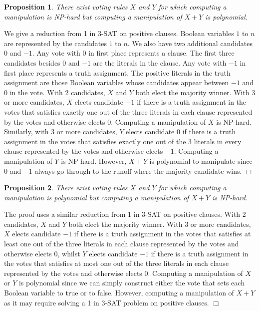 \documentclass{ecai2012}
\newcommand{\winner}[2]{\mbox{$#1 + #2$}}
\newtheorem{proposition}{Proposition}
\newcommand{\myproof}{\vspace{-3mm}\noindent {\bf Proof:\ \ }}
\newcommand{\myqed}{\mbox{$\Box$}}
\begin{document}


\begin{proposition}
There exist voting rules $X$ and $Y$
for which computing a manipulation
is NP-hard but computing a manipulation
of $\winner{X}{Y}$
is polynomial.
\end{proposition}
\myproof
We give a reduction from 1 in 3-SAT on
positive clauses. Boolean variables
$1$ to $n$ are represented by the candidates
$1$ to $n$. We also have two additional
candidates $0$ and $-1$. Any vote
with $0$ in first place represents
a clause. The first three candidates besides
$0$ and $-1$ are the literals in the
clause. Any vote with $-1$ in first place
represents a truth assignment.
The positive literals in the truth
assignment are those Boolean variables
whose candidates appear
between $-1$ and $0$ in the vote.
With 2 candidates, $X$ and $Y$ both
elect the majority winner.
With 3 or more candidates,
$X$ elects
candidate $-1$ if there is a truth
assignment in the votes that satisfies
exactly one out of the three literals in
each clause represented by the votes
and otherwise elects $0$.
Computing a manipulation of $X$ %
is NP-hard.
Similarly, with 3 or more candidates,
$Y$ elects
candidate $0$ if there is a truth
assignment in the votes that satisfies
exactly one out of the 3 literals in
every clause represented by the votes
and otherwise elects $-1$.
Computing a manipulation of $Y$ %
is NP-hard. However,
$\winner{X}{Y}$ is polynomial to
manipulate since $0$ and $-1$ always
go through to the runoff where
the majority candidate wins.
\myqed

\begin{proposition}
There exist voting rules $X$ and $Y$
for which computing a manipulation
is polynomial but computing a manipulation
of $\winner{X}{Y}$ is NP-hard.
\end{proposition}
\myproof
The proof uses a similar reduction from 1 in 3-SAT on
positive clauses.
With 2 candidates, $X$ and $Y$ both
elect the majority winner.
With 3 or more candidates,
$X$ elects
candidate $-1$ if there is a truth
assignment in the votes that satisfies
at least one out of the three literals in
each clause represented by the votes
and otherwise elects $0$,
whilst $Y$ elects
candidate $-1$ if there is a truth
assignment in the votes that satisfies
at most one out of the three literals in
each clause represented by the votes
and otherwise elects $0$.
Computing a manipulation of $X$ or $Y$
is polynomial since we can simply construct
either the vote that %
sets each Boolean variable to true or to false.
However, computing a manipulation of $\winner{X}{Y}$
as it may require
solving a 1 in 3-SAT problem on positive
clauses.
\myqed
\end{document}
